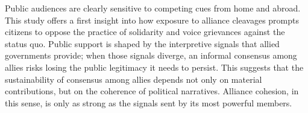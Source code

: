 Public audiences are clearly sensitive to competing cues from home and abroad. This study offers a first insight into how exposure to alliance cleavages prompts citizens to oppose the practice of solidarity and voice grievances against the status quo. Public support is shaped by the interpretive signals that allied governments provide; when those signals diverge, an informal consensus among allies risks losing the public legitimacy it needs to persist. This suggests that the sustainability of consensus among allies depends not only on material contributions, but on the coherence of political narratives. Alliance cohesion, in this sense, is only as strong as the signals sent by its most powerful members. 

\clearpage
\printbibliography
\clearpage

\clearpage
